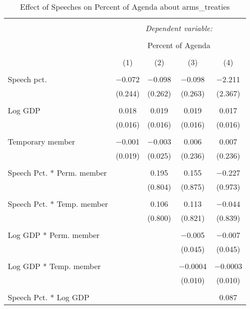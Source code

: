 
\begin{table}[!htbp] \centering 
  \caption{Effect of Speeches on Percent of Agenda about  arms_treaties} 
  \label{} 
\begin{tabular}{@{\extracolsep{5pt}}lcccc} 
\\[-1.8ex]\hline 
\hline \\[-1.8ex] 
 & \multicolumn{4}{c}{\textit{Dependent variable:}} \\ 
\cline{2-5} 
\\[-1.8ex] & \multicolumn{4}{c}{Percent of Agenda} \\ 
\\[-1.8ex] & (1) & (2) & (3) & (4)\\ 
\hline \\[-1.8ex] 
 Speech pct. & $-$0.072 & $-$0.098 & $-$0.098 & $-$2.211 \\ 
  & (0.244) & (0.262) & (0.263) & (2.367) \\ 
  & & & & \\ 
 Log GDP & 0.018 & 0.019 & 0.019 & 0.017 \\ 
  & (0.016) & (0.016) & (0.016) & (0.016) \\ 
  & & & & \\ 
 Temporary member & $-$0.001 & $-$0.003 & 0.006 & 0.007 \\ 
  & (0.019) & (0.025) & (0.236) & (0.236) \\ 
  & & & & \\ 
 Speech Pct. * Perm. member &  & 0.195 & 0.155 & $-$0.227 \\ 
  &  & (0.804) & (0.875) & (0.973) \\ 
  & & & & \\ 
 Speech Pct. * Temp. member &  & 0.106 & 0.113 & $-$0.044 \\ 
  &  & (0.800) & (0.821) & (0.839) \\ 
  & & & & \\ 
 Log GDP * Perm. member &  &  & $-$0.005 & $-$0.007 \\ 
  &  &  & (0.045) & (0.045) \\ 
  & & & & \\ 
 Log GDP * Temp. member &  &  & $-$0.0004 & $-$0.0003 \\ 
  &  &  & (0.010) & (0.010) \\ 
  & & & & \\ 
 Speech Pct. * Log GDP &  &  &  & 0.087 \\ 

\end{tabular}
\end{table}
